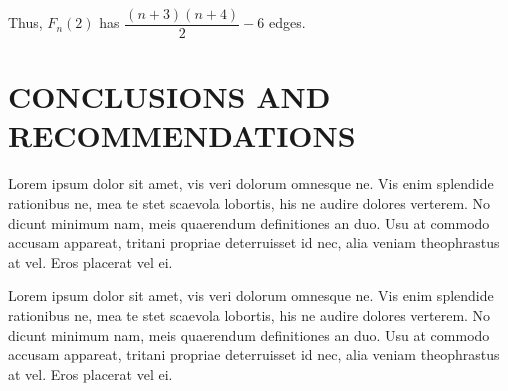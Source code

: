 \documentclass[12pt]{report}
\theoremstyle{definition}
\def\indent{\hspace*{.5cm}}
\begin{document}
   

\indent Thus, $F_{n}(2)$ has $\dfrac{(n+3)(n+4)}{2}-6$ edges.






\chapter{CONCLUSIONS AND RECOMMENDATIONS}
\thispagestyle{empty}

Lorem ipsum dolor sit amet, vis veri dolorum omnesque ne. Vis enim splendide rationibus ne, mea te stet scaevola lobortis, his ne audire dolores verterem. No dicunt minimum nam, meis quaerendum definitiones an duo. Usu at commodo accusam appareat, tritani propriae deterruisset id nec, alia veniam theophrastus at vel. Eros placerat vel ei.



\newpage

Lorem ipsum dolor sit amet, vis veri dolorum omnesque ne. Vis enim splendide rationibus ne, mea te stet scaevola lobortis, his ne audire dolores verterem. No dicunt minimum nam, meis quaerendum definitiones an duo. Usu at commodo accusam appareat, tritani propriae deterruisset id nec, alia veniam theophrastus at vel. Eros placerat vel ei.
\end{document}
